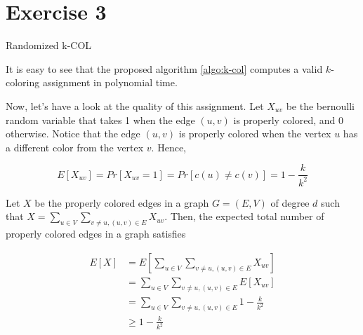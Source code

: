 \documentclass[12pt, a4paper]{article} %
\begin{document}

\section*{Exercise 3}%
\label{sec:exercise_3}

\begin{algorithm}[H]
  \SetAlgoNoLine
  \caption{Randomized k-COL}                                   
  \label{algo:k-col}
\end{algorithm}

It is easy to see that the proposed algorithm \ref{algo:k-col} computes a valid $k$-coloring assignment in polynomial time.
                                                                                  
Now, let's have a look at the quality of this assignment. Let $X_{uv}$ be the bernoulli random variable that takes 1 when the edge $(u,v)$ is properly colored, and 0 otherwise. Notice that the edge $(u,v)$ is properly colored when the vertex $u$ has a different color from the vertex $v$. Hence,

\begin{equation*}
  E[X_{uv}] = Pr[X_{uv} = 1] = Pr[c(u) \neq c(v)] = 1 - \frac{k}{k^{2}}
\end{equation*}

Let $X$ be the properly colored edges in a graph $G = (E, V)$ of degree $d$ such that $X = \sum_{u \in V}\sum_{v \neq u, (u,v) \in E} X_{uv}$. Then, the expected total number of properly colored edges in a graph satisfies

\begin{align*}
  E[X] &= E[\sum_{u \in V}\sum_{v \neq u, (u,v) \in E} X_{uv}] \\
       &= \sum_{u \in V}\sum_{v \neq u, (u,v) \in E} E[X_{uv}] \\
       &= \sum_{u \in V}\sum_{v \neq u, (u,v) \in E} 1 - \frac{k}{k^{2}} \\
       &\ge  1 - \frac{k}{k^{2}}
\end{align*}
\end{document}

